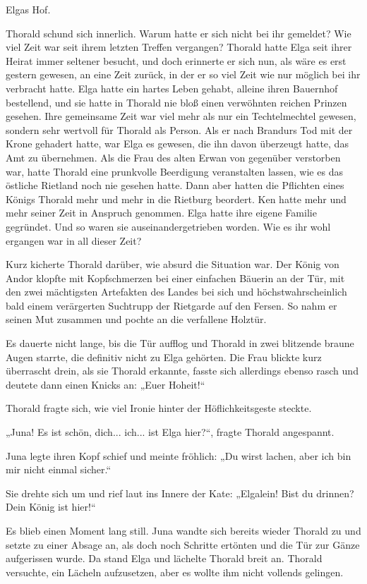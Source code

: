 \documentclass[10pt, a4paper, oneside]{book}
\begin{document}
Elgas Hof.

Thorald schund sich innerlich. Warum hatte er sich nicht bei ihr gemeldet? Wie viel Zeit war seit ihrem letzten Treffen vergangen? Thorald hatte Elga seit ihrer Heirat immer seltener besucht, und doch erinnerte er sich nun, als wäre es erst gestern gewesen, an eine Zeit zurück, in der er so viel Zeit wie nur möglich bei ihr verbracht hatte. Elga hatte ein hartes Leben gehabt, alleine ihren Bauernhof bestellend, und sie hatte in Thorald nie bloß einen verwöhnten reichen Prinzen gesehen. Ihre gemeinsame Zeit war viel mehr als nur ein Techtelmechtel gewesen, sondern sehr wertvoll für Thorald als Person. Als er nach Brandurs Tod mit der Krone gehadert hatte, war Elga es gewesen, die ihn davon überzeugt hatte, das Amt zu übernehmen. Als die Frau des alten Erwan von gegenüber verstorben war, hatte Thorald eine prunkvolle Beerdigung veranstalten lassen, wie es das östliche Rietland noch nie gesehen hatte. Dann aber hatten die Pflichten eines Königs Thorald mehr und mehr in die Rietburg beordert. Ken hatte mehr und mehr seiner Zeit in Anspruch genommen. Elga hatte ihre eigene Familie gegründet. Und so waren sie auseinandergetrieben worden. Wie es ihr wohl ergangen war in all dieser Zeit?

Kurz kicherte Thorald darüber, wie absurd die Situation war. Der König von Andor klopfte mit Kopfschmerzen bei einer einfachen Bäuerin an der Tür, mit den zwei mächtigsten Artefakten des Landes bei sich und höchstwahrscheinlich bald einem verärgerten Suchtrupp der Rietgarde auf den Fersen. So nahm er seinen Mut zusammen und pochte an die verfallene Holztür.

Es dauerte nicht lange, bis die Tür aufflog und Thorald in zwei blitzende braune Augen starrte, die definitiv nicht zu Elga gehörten. Die Frau blickte kurz überrascht drein, als sie Thorald erkannte, fasste sich allerdings ebenso rasch und deutete dann einen Knicks an: „Euer Hoheit!“

Thorald fragte sich, wie viel Ironie hinter der Höflichkeitsgeste steckte.

„Juna! Es ist schön, dich... ich... ist Elga hier?“, fragte Thorald angespannt.

Juna legte ihren Kopf schief und meinte fröhlich: „Du wirst lachen, aber ich bin mir nicht einmal sicher.“

Sie drehte sich um und rief laut ins Innere der Kate: „Elgalein! Bist du drinnen? Dein König ist hier!“

Es blieb einen Moment lang still. Juna wandte sich bereits wieder Thorald zu und setzte zu einer Absage an, als doch noch Schritte ertönten und die Tür zur Gänze aufgerissen wurde. Da stand Elga und lächelte Thorald breit an. Thorald versuchte, ein Lächeln aufzusetzen, aber es wollte ihm nicht vollends gelingen.
\end{document}
